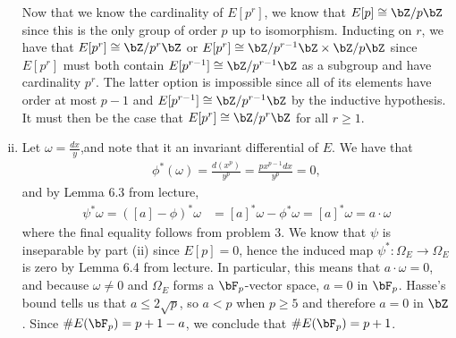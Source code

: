 \begin{homework}[e]
\begin{prf}
\begin{enumerate}[(i)]
				Now that we know the cardinality of $E[p^r]$, we know that $E[p] \cong \bZ/p\bZ$ since this is the only group of order $p$ up to isomorphism. Inducting on $r$, we have that $E[p^r] \cong \bZ/p^r\bZ$ or $E[p^r] \cong \bZ/p^{r-1}\bZ \times \bZ/p\bZ$ since $E[p^r]$ must both contain $E[p^{r-1}] \cong \bZ/p^{r-1}\bZ$ as a subgroup and have cardinality $p^r$. The latter option is impossible since all of its elements have order at most $p - 1$ and $E[p^{r-1}] \cong \bZ/p^{r-1}\bZ$ by the inductive hypothesis. It must then be the case that $E[p^r] \cong \bZ/p^r\bZ$ for all $r \geq 1$.

			\item Let $\omega = \frac{dx}{y}$,and note that it an invariant differential of $E$. We have that
				\begin{align*}
					\phi^*(\omega) = \frac{d(x^p)}{y^p} = \frac{px^{p-1}dx}{y^p} = 0,
				\end{align*}
				and by Lemma 6.3 from lecture,
				\begin{align*}
					\psi^*\omega = ([a] - \phi)^* \omega &= [a]^*\omega - \phi^*\omega = [a]^*\omega = a\cdot \omega
				\end{align*}
				where the final equality follows from problem 3. We know that $\psi$ is inseparable by part (ii) since $E[p] = 0$, hence the induced map $\psi^*:\Omega_E\to \Omega_E$ is zero by Lemma 6.4 from lecture. In particular, this means that $a\cdot \omega = 0$, and because $\omega \neq 0$ and $\Omega_E$ forms a $\bF_p$-vector space, $a = 0$ in $\bF_p$. Hasse's bound tells us that $a \leq 2\sqrt{p}$, so $a < p$ when $p \geq 5$ and therefore $a = 0$ in $\bZ$. Since $\#E(\bF_p) = p + 1 - a$, we conclude that $\#E(\bF_p) = p + 1$.
		\end{enumerate}
	\end{prf}
\end{homework}


